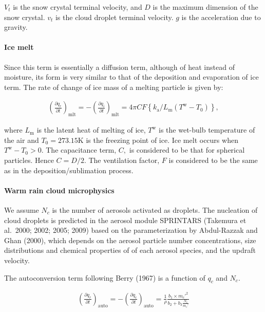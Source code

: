 \(V_{t}\) is the snow crystal terminal velocity, and \(D\) is the
maximum dimension of the snow crystal. \(v_{t}\) is the cloud droplet
terminal velocity. \(g\) is the acceleration due to gravity.

\hypertarget{ice-melt}{%
\paragraph{Ice melt}\label{ice-melt}}

Since this term is essentially a diffusion term, although of heat
instead of moisture, its form is very similar to that of the deposition
and evaporation of ice term. The rate of change of ice mass of a melting
particle is given by:

\begin{eqnarray}
\left(\frac{\partial q_r}{\partial t}\right)_{\text {mlt}}
=-\left(\frac{\partial q_i}{\partial t}\right)_{\text {mlt}}
=4 \pi C F\left\{k_{\mathrm{a}} / L_{\mathrm{m}}\left(T^{\mathrm{w}}-T_{0}\right)\right\},
\end{eqnarray}

where \(L_{\mathrm{m}}\) is the latent heat of melting of ice,
\(T^{\mathrm{w}}\) is the wet-bulb temperature of the air and
\(T_{0}=273.15\mathrm{K}\) is the freezing point of ice. Ice melt occurs
when \(T^{\mathrm{w}}-T_{0}>0\). The capacitance term, \(C,\) is
considered to be that for spherical particles. Hence \(C=D / 2 .\) The
ventilation factor, \(F\) is considered to be the same as in the
deposition/sublimation process.

\hypertarget{warm-rain-cloud-microphysics}{%
\paragraph{Warm rain cloud
microphysics}\label{warm-rain-cloud-microphysics}}

We assume \(N_c\) is the number of aerosols activated as droplets. The
nucleation of cloud droplets is predicted in the aerosol module
SPRINTARS (Takemura et al.~2000; 2002; 2005; 2009) based on the
parameterization by Abdul-Razzak and Ghan (2000), which depends on the
aerosol particle number concentrations, size distributions and chemical
properties of of each aerosol species, and the updraft velocity.

The autoconversion term following Berry (1967) is a function of \(q_c\)
and \(N_c\).

\begin{eqnarray}
\left(\frac{\partial q_r}{\partial t}\right)_{\text {auto}}
=-\left(\frac{\partial q_c}{\partial t}\right)_{\text {auto}}
=\frac{1}{\rho}
\frac{b_1 \times m_{c}'^{2}}{b_2+b_3 \frac{N_{c}}{m_{c}'}}
\end{eqnarray}


